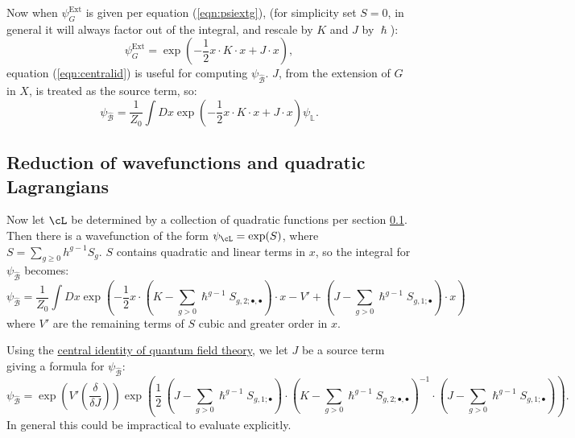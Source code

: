     Now when \( \psi_G^{\text{Ext}}\) is given per equation (\ref{eqn:psiextg}), (for simplicity set \(S=0\), in general it will always factor out of the integral, and rescale by \(K\) and \(J\) by \(\hslash\)):
    \[ \psi_G^{\text{Ext}} = \exp\left( -\frac{1}{2}  x \cdot K \cdot x + J \cdot x \right),\]
    equation (\ref{eqn:centralid}) is useful for computing \( \psi_{\widehat{\mathcal{B}}}\). \(J\), from the extension of \(G\) in \(X\), is treated as the source term, so:
    \[ \psi_{\widehat{\mathcal{B}}} = \frac{1}{Z_0} \int Dx \exp\left( -\frac{1}{2}  x\cdot K \cdot x + J \cdot x \right) \psi_{\mathbb{L}}. \]

    
    
    
    
    \subsection{Reduction of wavefunctions and quadratic Lagrangians}
    
    Now let \( \cL\) be determined by a collection of quadratic functions per section \ref{}. Then there is a wavefunction of the form \(\psi_{\cL} = \exp(S)\), where \(S= \sum_{g\geq 0} h^{g-1} S_g\). \(S\) contains quadratic and linear terms in \(x\), so the integral for \( \psi_{\widehat{\mathcal{B}}}\) becomes:
    \[\psi_{\widehat{\mathcal{B}}} = \frac{1}{Z_0}\int Dx \exp\left(-\frac12 x \cdot \left(K - \sum_{g>0} \hslash^{g-1} S_{g,2;\bullet,\bullet} \right) \cdot x - V' + \left(J-\sum_{g>0} \hslash^{g-1} S_{g,1;\bullet}\right) \cdot x\right) 
    \]
    where \(V'\) are the remaining terms of \(S\) cubic and greater order in \(x\).
    
    Using the \hyperref[]{central identity of quantum field theory}, we let \(J\) be a source term giving a formula for \( \psi_{\widehat{\mathcal{B}}}\):
    \[ \psi_{\widehat{\mathcal{B}}}  =  \exp\left(V'\left(\frac{\delta}{\delta J} \right) \right) \exp\left( \frac{1}{2}\, (J-\sum_{g>0} \hslash^{g-1} S_{g,1;\bullet}) \cdot (K-\sum_{g>0} \hslash^{g-1} S_{g,2;\bullet,\bullet})^{-1}\cdot (J-\sum_{g>0} \hslash^{g-1} S_{g,1;\bullet}) \right).  \]
    In general this could be impractical to evaluate explicitly.


    
    

